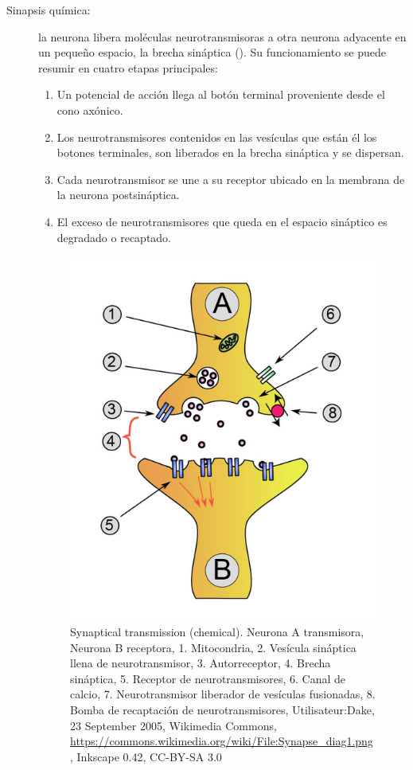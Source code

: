 \begin{description}
 \item [Sinapsis química:] la neurona libera moléculas neurotransmisoras a otra neurona adyacente en un pequeño espacio, la brecha sináptica (). Su funcionamiento se puede resumir en cuatro etapas principales:


\begin{enumerate}
 \item Un potencial de acción llega al botón terminal proveniente desde el cono axónico.
 \item Los neurotransmisores contenidos en las vesículas que están él los botones terminales, son liberados en la brecha sináptica y se dispersan.
 \item Cada neurotransmisor se une a su receptor ubicado en la membrana de la neurona postsináptica.
 \item El exceso de neurotransmisores que queda en el espacio sináptico es degradado o recaptado.
\end{enumerate}


\begin{figure}[h]
 \centering
 \includegraphics[scale=0.4]{../Figuras/SinapsisQuimica1.png}
 \caption{Synaptical transmission (chemical). Neurona A transmisora, Neurona B receptora, 1. Mitocondria, 2. Vesícula sináptica llena de neurotransmisor, 3. Autorreceptor, 4. Brecha sináptica, 5. Receptor de neurotransmisores, 6. Canal de calcio, 7. Neurotransmisor liberador de vesículas fusionadas, 8. Bomba de recaptación de neurotransmisores, Utilisateur:Dake, 23 September 2005, Wikimedia Commons, \url{https://commons.wikimedia.org/wiki/File:Synapse_diag1.png}, Inkscape 0.42, CC-BY-SA 3.0}
 \label{fig:sinapsisQ}
\end{figure}

\end{description}
